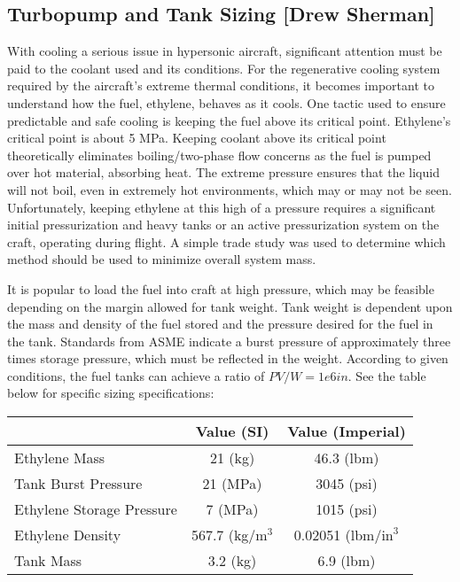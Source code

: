 \subsection{Turbopump and Tank Sizing [Drew Sherman]}
With cooling a serious issue in hypersonic aircraft, significant attention must be paid to the coolant used and its conditions. For the regenerative cooling system required by the aircraft’s extreme thermal conditions, it becomes important to understand how the fuel, ethylene, behaves as it cools. One tactic used to ensure predictable and safe cooling is keeping the fuel above its critical point. Ethylene’s critical point is about 5 MPa. Keeping coolant above its critical point theoretically eliminates boiling/two-phase flow concerns as the fuel is pumped over hot material, absorbing heat. The extreme pressure ensures that the liquid will not boil, even in extremely hot environments, which may or may not be seen. Unfortunately, keeping ethylene at this high of a pressure requires a significant initial pressurization and heavy tanks or an active pressurization system on the craft, operating during flight. A simple trade study was used to determine which method should be used to minimize overall system mass. 

It is popular to load the fuel into craft at high pressure, which may be feasible depending on the margin allowed for tank weight. Tank weight is dependent upon the mass and density of the fuel stored and the pressure desired for the fuel in the tank. Standards from ASME \cite{asme} indicate a burst pressure of approximately three times storage pressure, which must be reflected in the weight. According to given conditions, the fuel tanks can achieve a ratio of $PV/W = 1e6 in$. See the table below for specific sizing specifications: 

\begin{center}
\begin{tabular}{l | c | c}
& Value (SI) & Value (Imperial) \\
\hline
Ethylene Mass & 21 (kg) & 46.3 (lbm) \\
Tank Burst Pressure & 21 (MPa) & 3045 (psi) \\
Ethylene Storage Pressure & 7 (MPa) & 1015 (psi) \\
Ethylene Density & 567.7 (kg/$\text{m}^3$ & 0.02051 (lbm/$\text{in}^3$ \\
Tank Mass & 3.2 (kg) & 6.9 (lbm)
\end{tabular}
\end{center}

